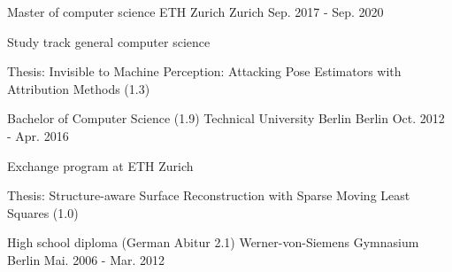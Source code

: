 

\begin{cventries}

  \cventry
    {Master of computer science} %
    {ETH Zurich} %
    {Zurich} %
    {Sep. 2017 - Sep. 2020} %
    {
      \begin{cvitems} %
        \item {Study track general computer science}
        \item {Thesis: Invisible to Machine Perception: Attacking Pose Estimators with Attribution Methods (1.3)}
      \end{cvitems}
    }


  \cventry
    {Bachelor of Computer Science (1.9)} %
    {Technical University Berlin} %
    {Berlin} %
    {Oct. 2012 - Apr. 2016} %
    {
      \begin{cvitems} %
        \item {Exchange program at ETH Zurich}
        \item {Thesis: Structure-aware Surface Reconstruction with Sparse Moving Least Squares (1.0)}
      \end{cvitems}
    }


  \cventry
    {High school diploma (German Abitur 2.1)} %
    {Werner-von-Siemens Gymnasium} %
    {Berlin} %
    {Mai. 2006 - Mar. 2012} %
    {}

\end{cventries}
